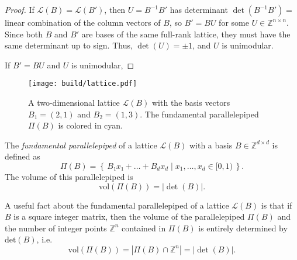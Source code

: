\begin{proof}
  If $\mathcal{L}(B) = \mathcal{L}(B')$, then $U = B^{-1} B'$ has determinant $\det(B^{-1} B') = $
  linear combination of the column vectors of $B$, so $B' = BU$ for some $U ∈ ℤ^{n×n}$.
  Since both $B$ and $B'$ are bases of the same full-rank lattice, they must have
  the same determinant up to sign.
  Thus, $\det(U) = ±1$, and $U$ is unimodular.

  If $B' = BU$ and $U$ is unimodular,
\end{proof}

\begin{figure}[tbp]
  \centering
  \texttt{[image: build/lattice.pdf]}
  \caption{
    A two-dimensional lattice $\mathcal L(B)$ with the basis vectors $B_1 = (2,
    1)$ and $B_2 = (1, 3)$. The fundamental parallelepiped $Π(B)$ is colored in
    {\color{cyan}cyan}.
  }
\end{figure}

\begin{definition}
  The \emph{fundamental parallelepiped} of a lattice $\mathcal{L}(B)$ with a basis $B ∈ ℤ^{d×d}$ is defined as
  \[
    Π(B) = \left\{\, B₁ x₁ + \dots + B_d x_d \mid x_1, \dots, x_d ∈ [0, 1) \,\right\}.
  \]
  The volume of this parallelepiped is
  \[
    \mathrm{vol}(Π(B)) = |\det(B)|.
  \]
\end{definition}

A useful fact about the fundamental parallelepiped of a lattice $\mathcal L(B)$
is that if $B$ is a square integer matrix, then the volume of the
parallelepiped $Π(B)$ and the number of integer points $ℤ^n$ contained in
$Π(B)$ is entirely determined by $\mathrm{det}(B)$, i.e.
\[
  \mathrm{vol}(Π(B)) = |Π(B) ∩ ℤ^n| = |\det(B)|.
\]
